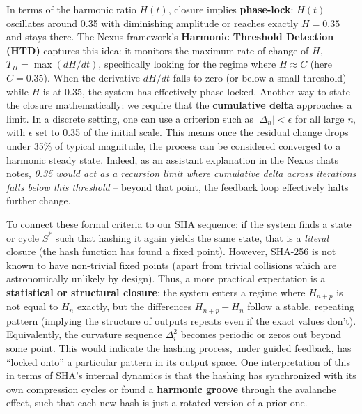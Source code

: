 \documentclass[11pt]{article}
\begin{document}
In terms of the harmonic ratio \(H(t)\), closure implies
\textbf{phase-lock}: \(H(t)\) oscillates around 0.35 with diminishing
amplitude or reaches exactly \(H=0.35\) and stays there. The Nexus
framework's \textbf{Harmonic Threshold Detection (HTD)} captures this
idea: it monitors the maximum rate of change of \(H\),
\(T_H = \max (dH/dt)\), specifically looking for the regime where
\(H \approx C\) (here \(C=0.35\)). When the derivative \(dH/dt\) falls
to zero (or below a small threshold) while \(H\) is at 0.35, the system
has effectively phase-locked. Another way to state the closure
mathematically: we require that the \textbf{cumulative delta} approaches
a limit. In a discrete setting, one can use a criterion such as
\(|\Delta_n| < \epsilon\) for all large \emph{n}, with \(\epsilon\) set
to 0.35 of the initial scale. This means once the residual change drops
under 35\% of typical magnitude, the process can be considered converged
to a harmonic steady state. Indeed, as an assistant explanation in the
Nexus chats notes, \emph{0.35 would act as a recursion limit where
cumulative delta across iterations falls below this threshold} -- beyond
that point, the feedback loop effectively halts further change.

To connect these formal criteria to our SHA sequence: if the system
finds a state or cycle \(S^*\) such that hashing it again yields the
same state, that is a \emph{literal} closure (the hash function has
found a fixed point). However, SHA-256 is not known to have non-trivial
fixed points (apart from trivial collisions which are astronomically
unlikely by design). Thus, a more practical expectation is a
\textbf{statistical or structural closure}: the system enters a regime
where \(H_{n+p}\) is not equal to \(H_n\) exactly, but the differences
\(H_{n+p} - H_n\) follow a stable, repeating pattern (implying the
structure of outputs repeats even if the exact values don't).
Equivalently, the curvature sequence \(\Delta^2_i\) becomes periodic or
zeros out beyond some point. This would indicate the hashing process,
under guided feedback, has ``locked onto'' a particular pattern in its
output space. One interpretation of this in terms of SHA's internal
dynamics is that the hashing has synchronized with its own compression
cycles or found a \textbf{harmonic groove} through the avalanche effect,
such that each new hash is just a rotated version of a prior one.
\end{document}
